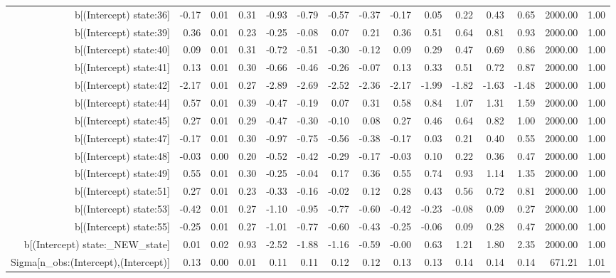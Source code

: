 \begin{table}[ht]
\begin{tabular}{rrrrrrrrrrrrrrr}
  b[(Intercept) state:36] & -0.17 & 0.01 & 0.31 & -0.93 & -0.79 & -0.57 & -0.37 & -0.17 & 0.05 & 0.22 & 0.43 & 0.65 & 2000.00 & 1.00 \\ 
  b[(Intercept) state:39] & 0.36 & 0.01 & 0.23 & -0.25 & -0.08 & 0.07 & 0.21 & 0.36 & 0.51 & 0.64 & 0.81 & 0.93 & 2000.00 & 1.00 \\ 
  b[(Intercept) state:40] & 0.09 & 0.01 & 0.31 & -0.72 & -0.51 & -0.30 & -0.12 & 0.09 & 0.29 & 0.47 & 0.69 & 0.86 & 2000.00 & 1.00 \\ 
  b[(Intercept) state:41] & 0.13 & 0.01 & 0.30 & -0.66 & -0.46 & -0.26 & -0.07 & 0.13 & 0.33 & 0.51 & 0.72 & 0.87 & 2000.00 & 1.00 \\ 
  b[(Intercept) state:42] & -2.17 & 0.01 & 0.27 & -2.89 & -2.69 & -2.52 & -2.36 & -2.17 & -1.99 & -1.82 & -1.63 & -1.48 & 2000.00 & 1.00 \\ 
  b[(Intercept) state:44] & 0.57 & 0.01 & 0.39 & -0.47 & -0.19 & 0.07 & 0.31 & 0.58 & 0.84 & 1.07 & 1.31 & 1.59 & 2000.00 & 1.00 \\ 
  b[(Intercept) state:45] & 0.27 & 0.01 & 0.29 & -0.47 & -0.30 & -0.10 & 0.08 & 0.27 & 0.46 & 0.64 & 0.82 & 1.00 & 2000.00 & 1.00 \\ 
  b[(Intercept) state:47] & -0.17 & 0.01 & 0.30 & -0.97 & -0.75 & -0.56 & -0.38 & -0.17 & 0.03 & 0.21 & 0.40 & 0.55 & 2000.00 & 1.00 \\ 
  b[(Intercept) state:48] & -0.03 & 0.00 & 0.20 & -0.52 & -0.42 & -0.29 & -0.17 & -0.03 & 0.10 & 0.22 & 0.36 & 0.47 & 2000.00 & 1.00 \\ 
  b[(Intercept) state:49] & 0.55 & 0.01 & 0.30 & -0.25 & -0.04 & 0.17 & 0.36 & 0.55 & 0.74 & 0.93 & 1.14 & 1.35 & 2000.00 & 1.00 \\ 
  b[(Intercept) state:51] & 0.27 & 0.01 & 0.23 & -0.33 & -0.16 & -0.02 & 0.12 & 0.28 & 0.43 & 0.56 & 0.72 & 0.81 & 2000.00 & 1.00 \\ 
  b[(Intercept) state:53] & -0.42 & 0.01 & 0.27 & -1.10 & -0.95 & -0.77 & -0.60 & -0.42 & -0.23 & -0.08 & 0.09 & 0.27 & 2000.00 & 1.00 \\ 
  b[(Intercept) state:55] & -0.25 & 0.01 & 0.27 & -1.01 & -0.77 & -0.60 & -0.43 & -0.25 & -0.06 & 0.09 & 0.28 & 0.47 & 2000.00 & 1.00 \\ 
  b[(Intercept) state:\_NEW\_state] & 0.01 & 0.02 & 0.93 & -2.52 & -1.88 & -1.16 & -0.59 & -0.00 & 0.63 & 1.21 & 1.80 & 2.35 & 2000.00 & 1.00 \\ 
  Sigma[n\_obs:(Intercept),(Intercept)] & 0.13 & 0.00 & 0.01 & 0.11 & 0.11 & 0.12 & 0.12 & 0.13 & 0.13 & 0.14 & 0.14 & 0.14 & 671.21 & 1.01 \\ 

\end{tabular}
\end{table}
